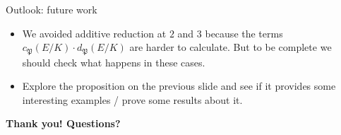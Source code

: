 \documentclass{beamer}
\newcommand{\Reg}{\mathrm{Reg}}
\newcommand{\rk}{\mathrm{rk}}
\newcommand{\fP}{\mathfrak{P}}
\theoremstyle{plain}
\begin{document}
\begin{frame}{Outlook: future work}
\begin{itemize}
    \item We avoided additive reduction at $2$ and $3$ because the terms $c_{\fP}(E / K) \cdot d_{\fP}(E / K)$ are harder to calculate. But to be complete we should check what happens in these cases. \pause 
    \item Explore the proposition on the previous slide and see if it provides some interesting examples / prove some results about it. 
\end{itemize}
\end{frame}



\begin{frame}
    \vspace{4em}
    \begin{center}
        \textbf{Thank you! Questions?}
    \end{center}
\end{frame}

\begin{frame} 
    
    
\end{frame}
\end{document}
